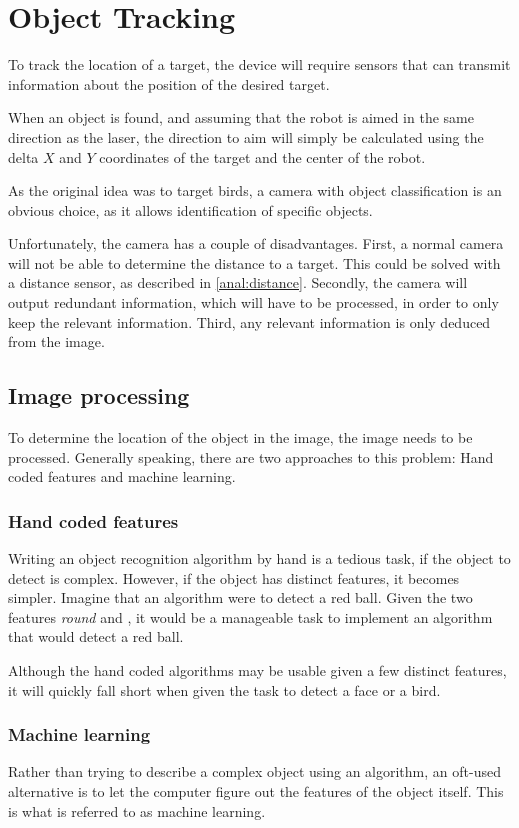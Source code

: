 \section{Object Tracking}
\label{sec:obj_tracking}
To track the location of a target, the device will require sensors that can transmit information about the position of the desired target.


When an object is found, and assuming that the robot is aimed in the same direction as the laser, the direction to aim will simply be calculated using the delta $X$ and $Y$ coordinates of the target and the center of the robot.

As the original idea was to target birds, a camera with object classification is an obvious choice, as it allows identification of specific objects.


Unfortunately, the camera has a couple of disadvantages.
First, a normal camera will not be able to determine the distance to a target.
This could be solved with a distance sensor, as described in \autoref{anal:distance}.
Secondly, the camera will output redundant information, which will have to be processed, in order to only keep the relevant information.
Third, any relevant information is only deduced from the image.

\subsection{Image processing}
To determine the location of the object in the image, the image needs to be processed.
Generally speaking, there are two approaches to this problem: Hand coded features and machine learning.

\subsubsection{Hand coded features}
Writing an object recognition algorithm by hand is a tedious task, if the object to detect is complex.
However, if the object has distinct features, it becomes simpler.
Imagine that an algorithm were to detect a red ball.
Given the two features \textit{round} and , it would be a manageable task to implement an algorithm that would detect a red ball.

Although the hand coded algorithms may be usable given a few distinct features, it will quickly fall short when given the task to detect a face or a bird.

\subsubsection{Machine learning}\label{sec:obj_tracking:sub:ML}
Rather than trying to describe a complex object using an algorithm, an oft-used alternative is to let the computer figure out the features of the object itself.
This is what is referred to as machine learning.

